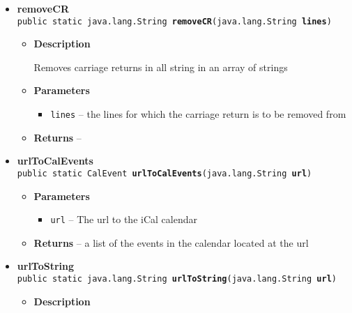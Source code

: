 \documentclass[11pt,a4paper]{report}
\begin{document}
{{{\begin{itemize}
{\begin{itemize}
{Takes a string containing an iCal calendar and returns a list of the events in the calendar
}
\item{
{\bf  Parameters}
  \begin{itemize}
   \item{
\texttt{calendar} -- A string of an iCal calendar}
  \end{itemize}
}%
\item{{\bf  Returns} -- 
a list of the events in the calendar cal 
}%
\end{itemize}
}%
\item{ 
{\bf  removeCR}\\
\texttt{public static java.lang.String\lbrack \rbrack \ {\bf  removeCR}(\texttt{java.lang.String\lbrack \rbrack } {\bf  lines})
\label{is.mpg.ruglan.iCalParser.removeCR(java.lang.String[])}}%
\begin{itemize}
\item{
{\bf  Description}

Removes carriage returns in all string in an array of strings
}
\item{
{\bf  Parameters}
  \begin{itemize}
   \item{
\texttt{lines} -- the lines for which the carriage return is to be removed from}
  \end{itemize}
}%
\item{{\bf  Returns} -- 
 
}%
\end{itemize}
}%
\item{ 
{\bf  urlToCalEvents}\\
\texttt{public static CalEvent\lbrack \rbrack \ {\bf  urlToCalEvents}(\texttt{java.lang.String} {\bf  url})
\label{is.mpg.ruglan.iCalParser.urlToCalEvents(java.lang.String)}}%
\begin{itemize}
\item{
{\bf  Parameters}
  \begin{itemize}
   \item{
\texttt{url} -- The url to the iCal calendar}
  \end{itemize}
}%
\item{{\bf  Returns} -- 
a list of the events in the calendar located at the url 
}%
\end{itemize}
}%
\item{ 
{\bf  urlToString}\\
\texttt{public static java.lang.String\ {\bf  urlToString}(\texttt{java.lang.String} {\bf  url})
\label{is.mpg.ruglan.iCalParser.urlToString(java.lang.String)}}%
\begin{itemize}
\item{
{\bf  Description}

}
\end{itemize}}
\end{itemize}}}}
\end{document}
